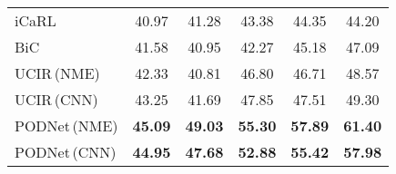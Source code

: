\begin{table}[t]
\begin{subtable}[b]{.62\textwidth}
\begin{tabular}{@{}lccccc@{}}
            \midrule
            iCaRL \cite{rebuffi2017icarl}                & 40.97                                 & 41.28          & 43.38          & 44.35          & 44.20          \\
            BiC \cite{wu2019bias_correction}             & 41.58                                 & 40.95          & 42.27          & 45.18          & 47.09          \\
            UCIR\,{\scriptsize (NME)} \cite{hou2019ucir} & 42.33                                 & 40.81          & 46.80          & 46.71          & 48.57          \\
            UCIR\,{\scriptsize (CNN)} \cite{hou2019ucir} & 43.25                                 & 41.69          & 47.85          & 47.51          & 49.30          \\
            PODNet\,{\scriptsize (NME)}                  & \textbf{45.09}                        & \textbf{49.03} & \textbf{55.30} & \textbf{57.89} & \textbf{61.40} \\
            PODNet\,{\scriptsize (CNN)}                  & \textbf{44.95}                        & \textbf{47.68} & \textbf{52.88} & \textbf{55.42} & \textbf{57.98} \\
            \bottomrule
        \end{tabular}
    \end{subtable}
\end{table}
\captionsetup[table]{skip=10pt}
